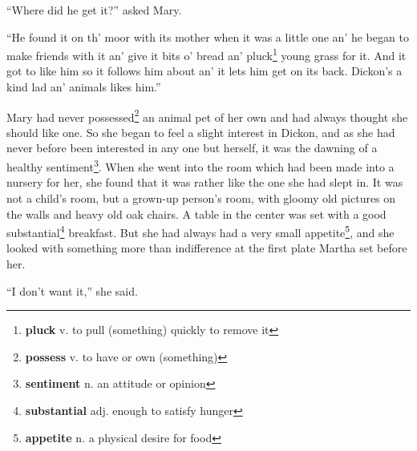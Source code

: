``Where did he get it?'' asked Mary.

``He found it on th' moor with its mother when it was a little one an' he began to make friends with it an' give it bits o' bread an' pluck\footnote{\textbf{pluck} v. to pull (something) quickly to remove it} young grass for it. And it got to like him so it follows him about an' it lets him get on its back. Dickon's a kind lad an' animals likes him.''

Mary had never possessed\footnote{\textbf{possess} v. to have or own (something)} an animal pet of her own and had always thought she should like one. So she began to feel a slight interest in Dickon, and as she had never before been interested in any one but herself, it was the dawning of a healthy sentiment\footnote{\textbf{sentiment} n. an attitude or opinion}. When she went into the room which had been made into a nursery for her, she found that it was rather like the one she had slept in. It was not a child's room, but a grown-up person's room, with gloomy old pictures on the walls and heavy old oak chairs. A table in the center was set with a good substantial\footnote{\textbf{substantial} adj. enough to satisfy hunger} breakfast. But she had always had a very small appetite\footnote{\textbf{appetite} n. a physical desire for food}, and she looked with something more than indifference at the first plate Martha set before her.

``I don't want it,'' she said.
